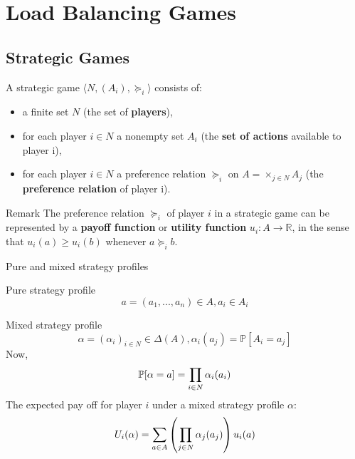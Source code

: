 \documentclass{beamer}
\renewcommand{\P}{\mathbb{P}}
\newcommand{\R}{\mathbb{R}}
\begin{document}
\section{Load Balancing Games}
\subsection{Strategic Games}
\begin{frame}
\begin{definition}
A strategic game $\langle N, (A_i), \succeq_i\rangle$ consists of:
\begin{itemize}
  \item a finite set $N$  (the set of \textbf{players}),
  \item for each player $i \in N$ a nonempty set $A_i$ (the \textbf{set of actions} available to player i),
  \item for each player $i \in N$ a preference relation $\succeq_i$ on $A=\times_{j\in N}A_j$ (the \textbf{preference relation} of player i).
\end{itemize}
\end{definition}
\begin{alertblock}{Remark}
The preference relation  $\succeq_i$ of player $i$ in a strategic game can be represented by a \textbf{payoff function} or \textbf{utility function} $u_i: A \rightarrow \R$, in the sense that $u_i(a) \geq u_i(b)$ whenever $a \succeq_i b$.
\end{alertblock}
\end{frame}


\begin{frame}{Pure and mixed strategy profiles}
\begin{block}{Pure strategy profile}
$$a = (a_1,...,a_n) \in A, a_i \in A_i$$
\end{block}

\begin{block}{Mixed strategy profile}
$$\alpha = \left(\alpha_i\right)_{i\in N} \in \Delta(A), \alpha_i(a_j) = \P[A_i = a_j]$$
Now,
$$\small{\P[\alpha = a] = \displaystyle\prod_{i \in N} \alpha_i(a_i)}$$
The expected pay off for player $i$ under a mixed strategy profile $\alpha$:
$$\small{U_i(\alpha) = \displaystyle\sum_{a \in A}{\left(\prod_{j \in N}{\alpha_j(a_j)}\right) u_i(a)}}$$
\end{block}

\end{frame}
\end{document}
